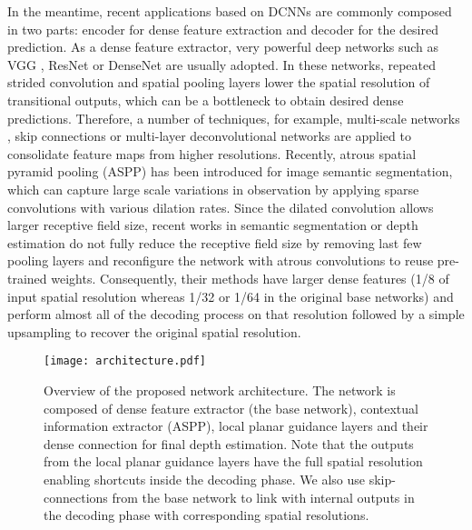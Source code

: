 \documentclass[10pt,twocolumn,letterpaper]{article}
\begin{document}
In the meantime, recent applications based on DCNNs are commonly composed in two parts: encoder for dense feature extraction and decoder for the desired prediction.
As a dense feature extractor, very powerful deep networks such as VGG \cite{simonyan2014very}, ResNet \cite{he2016deep} or DenseNet \cite{huang2017densely} are usually adopted.
In these networks, repeated strided convolution and spatial pooling layers lower the spatial resolution of transitional outputs, which can be a bottleneck to obtain desired dense predictions.
Therefore, a number of techniques, for example, multi-scale networks \cite{liu2016learning,eigen2015predicting}, skip connections \cite{godard2017unsupervised,xie2016deep3d} or multi-layer deconvolutional networks \cite{laina2016deeper,garg2016unsupervised,kuznietsov2017semi} are applied to consolidate feature maps from higher resolutions.
Recently, atrous spatial pyramid pooling (ASPP) \cite{chen2018deeplab} has been introduced for image semantic segmentation, which can capture large scale variations in observation by applying sparse convolutions with various dilation rates.
Since the dilated convolution allows larger receptive field size, recent works in semantic segmentation \cite{chen2018deeplab,yang2018denseaspp} or depth estimation \cite{fu2018deep} do not fully reduce the receptive field size by removing last few pooling layers and reconfigure the network with atrous convolutions to reuse pre-trained weights.
Consequently, their methods have larger dense features (1/8 of input spatial resolution whereas 1/32 or 1/64 in the original base networks) and perform almost all of the decoding process on that resolution followed by a simple upsampling to recover the original spatial resolution.

\begin{figure*}[t!]
	\centering	
	\texttt{[image: architecture.pdf]}
	\caption{Overview of the proposed network architecture.
		The network is composed of dense feature extractor (the base network), contextual information extractor (ASPP), local planar guidance layers and their dense connection for final depth estimation.
		Note that the outputs from the local planar guidance layers have the full spatial resolution  enabling shortcuts inside the decoding phase.
		We also use skip-connections from the base network to link with internal outputs in the decoding phase with corresponding spatial resolutions.}
	\label{fg:architecture}
\end{figure*}
\end{document}
